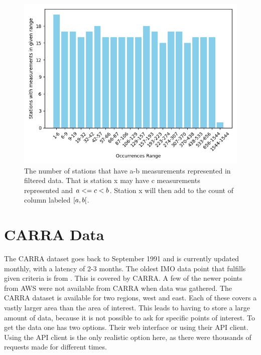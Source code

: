 \begin{figure}
    \centering
    \includegraphics[scale = 0.75]{Figures/station_occurrences_20.png}
    \caption[Number of stations that have measurements in a range.]{The number of stations that have a-b measurements represented in filtered data. That is station x may have c measurements represented and $\protect a <= c < b$. Station x will then add to the count of column labeled $\protect [a, b[$.}
    \label{fig:occurrences_by_station_20}
\end{figure}

\section{CARRA Data}
    The CARRA dataset goes back to September 1991 and is currently updated monthly, with a latency of 2-3 months\cite{carra_information}. The oldest IMO data point that fulfills given criteria is from \startDateVedur. This is covered by CARRA. A few of the newer points from AWS were not available from CARRA when data was gathered. The CARRA dataset is available for two regions, west and east. Each of these covers a vastly larger area than the area of interest. This leads to having to store a large amount of data, because it is not possible to ask for specific points of interest. To get the data one has two options. Their web interface or using their API client. Using the API client is the only realistic option here, as there were thousands of requests made for different times.

